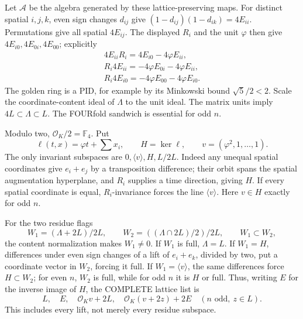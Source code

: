 \documentclass[11pt]{article}
\begin{document}
Let \(\mathcal A\) be the algebra generated by
these lattice-preserving maps.
For distinct spatial \(i,j,k\), even sign
changes \(d_{ij}\) give
\((1-d_{ij})(1-d_{ik})=4E_{ii}\).
Permutations give all spatial \(4E_{ij}\).
The displayed \(R_i\) and the unit \(\varphi\)
then give \(4E_{i0},4E_{0i},4E_{00}\);
explicitly
\[
 \begin{gathered}
 4E_{ii}R_i=4E_{i0}-4\varphi E_{ii},\\
 R_i4E_{ii}=-4\varphi E_{0i}-4\varphi E_{ii},\\
 R_i4E_{i0}=-4\varphi E_{00}-4\varphi E_{i0}.
 \end{gathered}
\]
The golden ring is a PID, for example by its
Minkowski bound \(\sqrt5/2<2\).
Scale the coordinate-content ideal of \(\Lambda\)
to the unit ideal.
The matrix units imply
\(4L\subset\Lambda\subset L\).
The FOURfold sandwich is essential for odd \(n\).

Modulo two, \(\mathcal O_K/2=\mathbb F_4\).
Put
\[
 \ell(t,x)=\varphi t+\sum x_i,\qquad
 H=\ker\ell,\qquad v=(\varphi^2,1,\ldots,1).
\]
The only invariant subspaces are
\(0,\langle v\rangle,H,L/2L\).
Indeed any unequal spatial coordinates give
\(e_i+e_j\) by a transposition difference;
their orbit spans the spatial augmentation
hyperplane, and \(R_i\) supplies a time direction,
giving \(H\).
If every spatial coordinate is equal,
\(R_i\)-invariance forces the line \(\langle v\rangle\).
Here \(v\in H\) exactly for odd \(n\).

For the two residue flags
\[
 W_1=(\Lambda+2L)/2L,\qquad
 W_2=((\Lambda\cap2L)/2)/2L,\qquad W_1\subset W_2,
\]
the content normalization makes \(W_1\ne0\).
If \(W_1\) is full, \(\Lambda=L\).
If \(W_1=H\), differences under even sign
changes of a lift of \(e_i+e_k\), divided by two,
put a coordinate vector in \(W_2\), forcing it full.
If \(W_1=\langle v\rangle\), the same differences
force \(H\subset W_2\); for even \(n\), \(W_2\)
is full, while for odd \(n\) it is \(H\) or full.
Thus, writing \(E\) for the inverse image of \(H\),
the COMPLETE lattice list is
\[
           L,\quad E,\quad\mathcal O_Kv+2L,\quad
           \mathcal O_K(v+2z)+2E\quad(n\text{ odd},\ z\in L).
\]
This includes every lift, not merely every residue
subspace.
\end{document}
